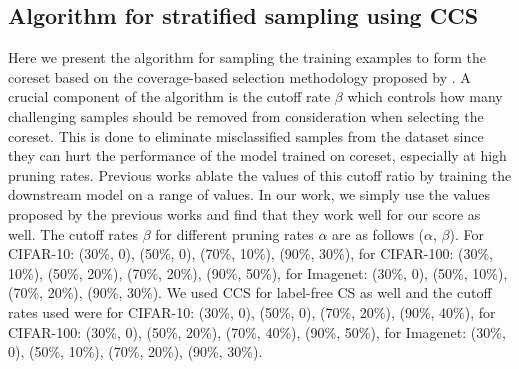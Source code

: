 \subsection{Algorithm for stratified sampling using CCS \cite{zheng2022coverage}}
\label{app:CCS_sampling}
Here we present the algorithm for sampling the training examples to form the coreset based on the coverage-based selection methodology proposed by \cite{zheng2022coverage}.
A crucial component of the algorithm is the cutoff rate $\beta$ which controls how many challenging samples should be removed from consideration when selecting the coreset. 
This is done to eliminate misclassified samples from the dataset since they can hurt the performance of the model trained on coreset, especially at high pruning rates.
Previous works \cite{zheng2022coverage,zheng2024elfs} ablate the values of this cutoff ratio by training the downstream model on a range of values. 
In our work, we simply use the values proposed by the previous works and find that they work well for our score as well. 
The cutoff rates $\beta$ for different pruning rates $\alpha$ are as follows ($\alpha$, $\beta$).
For CIFAR-10: (30\%, 0), (50\%, 0), (70\%, 10\%), (90\%, 30\%), 
for CIFAR-100: (30\%, 10\%), (50\%, 20\%), (70\%, 20\%), (90\%, 50\%), 
for Imagenet: (30\%, 0), (50\%, 10\%), (70\%, 20\%), (90\%, 30\%).
We used CCS for label-free CS as well and the cutoff rates used were
for CIFAR-10: (30\%, 0), (50\%, 0), (70\%, 20\%), (90\%, 40\%), 
for CIFAR-100: (30\%, 0), (50\%, 20\%), (70\%, 40\%), (90\%, 50\%), 
for Imagenet: (30\%, 0), (50\%, 10\%), (70\%, 20\%), (90\%, 30\%).

